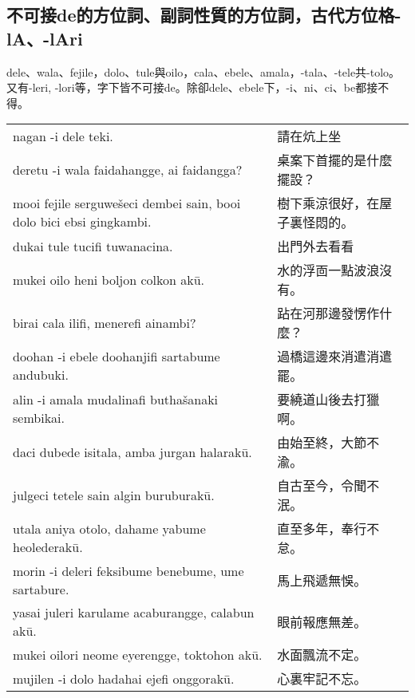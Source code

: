 \documentclass{article}
\begin{document}
\subsection{不可接de的方位詞、副詞性質的方位詞，古代方位格-lA、-lAri}
\noindent dele、wala、fejile，dolo、tule與oilo，cala、ebele、amala，-tala、-tele共-tolo。又有-leri, -lori等，字下皆不可接de。除卻dele、ebele下，-i、ni、ci、be都接不得。
\begin{center}
    \begin{tabularx}{\textwidth}{XX}
        nagan -i dele teki. & 請在炕上坐\\
        deretu -i wala faidahangge, ai faidangga? & 桌案下首擺的是什麼擺設？\\
        mooi fejile serguwe\v{s}eci dembei sain, booi dolo bici ebsi gingkambi. & 樹下乘涼很好，在屋子裏怪悶的。\\
        dukai tule tucifi tuwanacina. & 出門外去看看\\
        mukei oilo heni boljon colkon ak\={u}. & 水的浮靣一點波浪沒有。\\
        birai cala ilifi, menerefi ainambi? & 跕在河那邊發愣作什麼？\\
        doohan -i ebele doohanjifi sartabume andubuki. & 過橋這邊來消遣消遣罷。\\
        alin -i amala mudalinafi butha\v{s}anaki sembikai. & 要繞道山後去打獵啊。\\
        daci dubede isitala, amba jurgan halarak\={u}. & 由始至終，大節不渝。\\
        julgeci tetele sain algin buruburak\={u}. & 自古至今，令聞不泯。\\
        utala aniya otolo, dahame yabume heolederak\={u}. & 直至多年，奉行不怠。\\
        morin -i deleri feksibume benebume, ume sartabure. & 馬上飛遞無悞。\\
        yasai juleri karulame acaburangge, calabun ak\={u}. & 眼前報應無差。\\
        mukei oilori neome eyerengge, toktohon ak\={u}. & 水面飄流不定。\\
        mujilen -i dolo hadahai ejefi onggorak\={u}. & 心裏牢記不忘。
    \end{tabularx}
\end{center}
\end{document}
